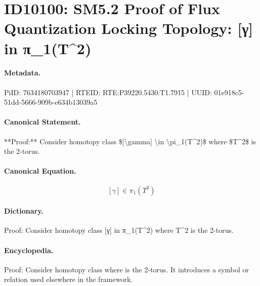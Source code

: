 \section*{ID10100: SM5.2 Proof of Flux Quantization Locking Topology: [γ] in π\_1(T\textasciicircum{}2)}
\paragraph{Metadata.}
PiID: 7634180703947 | RTEID: RTE:P39220.5430:T1.7915 | UUID: 01e918c5-51dd-5666-909b-e634b13039a5

\paragraph{Canonical Statement.}
**Proof:** Consider homotopy class \$[\textbackslash{}gamma] \textbackslash{}in \textbackslash{}pi\_1(T\textasciicircum{}2)\$ where \$T\textasciicircum{}2\$ is the 2-torus.

\paragraph{Canonical Equation.}
\[
[\gamma] \in \pi_1(T^2)
\]

\paragraph{Dictionary.}
Proof: Consider homotopy class [γ] in π\_1(T\textasciicircum{}2) where T\textasciicircum{}2 is the 2-torus.

\paragraph{Encyclopedia.}
Proof: Consider homotopy class where is the 2-torus. It introduces a symbol or relation used elsewhere in the framework.
